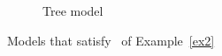 \begin{figure}
\begin{subfigure}{.5\textwidth}
\begin{tikzpicture}[->,circle,draw,node distance=2.4cm,fill=black
                   ]
\end{tikzpicture} 
        \vspace{0.5mm}
              \caption{Tree model}
                \label{example_tree-like}
    \end{subfigure}
    \caption{Models that satisfy \formula~of Example~\ref{ex2}}
    \label{example_models}
\end{figure}

